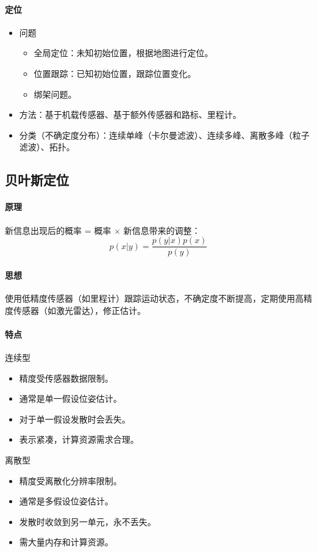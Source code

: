 \documentclass[
12pt, %
a4paper, 
oneside, %
headinclude,footinclude, %
]{scrartcl}
\begin{document}
\paragraph{定位}
\begin{itemize}
\item 问题
\begin{itemize}
\item 全局定位：未知初始位置，根据地图进行定位。
\item 位置跟踪：已知初始位置，跟踪位置变化。
\item 绑架问题。
\end{itemize}
\item 方法：基于机载传感器、基于额外传感器和路标、里程计。
\item 分类（不确定度分布）：连续单峰（卡尔曼滤波）、连续多峰、离散多峰（粒子滤波）、拓扑。
\end{itemize}
\subsection[贝叶斯定位]{贝叶斯定位}
\paragraph{原理}
新信息出现后的概率 = 概率 $ \times $ 新信息带来的调整：
$$ p(x|y) = \frac{p(y|x)p(x)}{p(y)} $$
\paragraph{思想}
使用低精度传感器（如里程计）跟踪运动状态，不确定度不断提高，定期使用高精度传感器（如激光雷达），修正估计。
\paragraph{特点}
\begin{itemize}
\begin{minipage}{0.5\textwidth}
\item 连续型
\begin{itemize}
\item 精度受传感器数据限制。
\item 通常是单一假设位姿估计。
\item 对于单一假设发散时会丢失。
\item 表示紧凑，计算资源需求合理。
\end{itemize}
\end{minipage}
\begin{minipage}{0.5\textwidth}
\item 离散型
\begin{itemize}
\item 精度受离散化分辨率限制。
\item 通常是多假设位姿估计。
\item 发散时收敛到另一单元，永不丢失。
\item 需大量内存和计算资源。
\end{itemize}
\end{minipage}
\end{itemize}
\end{document}
